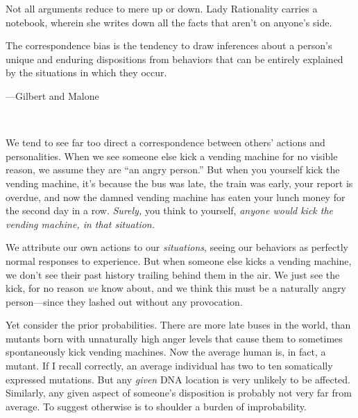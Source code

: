 {
 Not all arguments reduce to mere up or down. Lady Rationality
carries a notebook, wherein she writes down all the facts that
aren't on anyone's side.}

\myendsectiontext


\bigskip


{
 The correspondence bias is the tendency to draw inferences about a
person's unique and enduring dispositions from
behaviors that can be entirely explained by the situations in which
they occur.}

{\raggedleft
 {}---Gilbert and Malone
\par}


\bigskip

{
 ~}

{
 We tend to see far too direct a correspondence between
others' actions and personalities. When we see someone
else kick a vending machine for no visible reason, we assume they are
``an angry person.'' But when you
yourself kick the vending machine, it's because the bus
was late, the train was early, your report is overdue, and now the
damned vending machine has eaten your lunch money for the second day in
a row. \textit{Surely,} you think to yourself, \textit{anyone would
kick the vending machine, in that situation.}}

{
 We attribute our own actions to our \textit{situations}, seeing
our behaviors as perfectly normal responses to experience. But when
someone else kicks a vending machine, we don't see
their past history trailing behind them in the air. We just see the
kick, for no reason \textit{we} know about, and we think this must be a
naturally angry person---since they lashed out without any
provocation.}

{
 Yet consider the prior probabilities. There are more late buses in
the world, than mutants born with unnaturally high anger levels that
cause them to sometimes spontaneously kick vending machines. Now the
average human is, in fact, a mutant. If I recall correctly, an average
individual has two to ten somatically expressed mutations. But any
\textit{given} DNA location is very unlikely to be affected. Similarly,
any given aspect of someone's disposition is probably
not very far from average. To suggest otherwise is to shoulder a burden
of improbability.}

